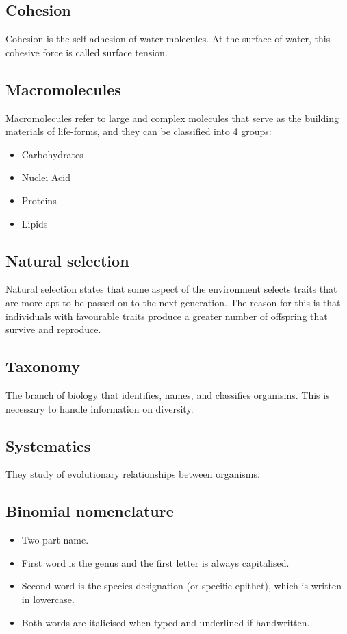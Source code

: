 \documentclass[11pt]{article}
\begin{document}
\subsection{Cohesion}
\label{sec:org0b2c367}
Cohesion is the self-adhesion of water molecules. At the surface of water, this cohesive force is called surface tension.

\subsection{Macromolecules}
\label{sec:orgd8ec7fe}
Macromolecules refer to large and complex molecules that serve as the building materials of life-forms, and they can be classified into 4 groups:
\begin{itemize}
\item Carbohydrates
\item Nuclei Acid
\item Proteins
\item Lipids
\end{itemize}

\subsection{Natural selection}
\label{sec:orgc4a6408}
Natural selection states that some aspect of the environment selects traits that are more apt to be passed on to the next generation. The reason for this is that individuals with favourable traits produce a greater number of offspring that survive and reproduce.

\subsection{Taxonomy}
\label{sec:org36dd38f}
The branch of biology that identifies, names, and classifies organisms. This is necessary to handle information on diversity.

\subsection{Systematics}
\label{sec:org67f75b9}
They study of evolutionary relationships between organisms.

\subsection{Binomial nomenclature}
\label{sec:orge4dd8b8}
\begin{itemize}
\item Two-part name.
\item First word is the genus and the first letter is always capitalised.
\item Second word is the species designation (or specific epithet), which is written in lowercase.
\item Both words are italicised when typed and underlined if handwritten.
\end{itemize}
\end{document}
